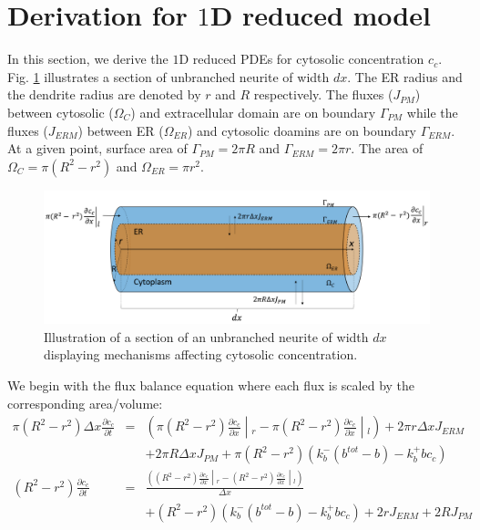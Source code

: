 \documentclass[review,supplement,onefignum,onetabnum]{siamart190516}
\begin{document}
\newpage
\section{Derivation for $1$D reduced model}
In this section, we derive the $1$D reduced PDEs for cytosolic \Ca concentration $c_c$. Fig. \ref{fig:Illustration_Supp} illustrates a section of unbranched neurite of width $dx$. The ER radius and the dendrite radius are denoted by $r$ and $R$ respectively. The fluxes ($J_{PM}$) between cytosolic ($\Omega_{C}$) and extracellular domain are on boundary $\Gamma_{PM}$ while the fluxes ($J_{ERM}$) between ER ($\Omega_{ER}$) and cytosolic doamins are on boundary $\Gamma_{ERM}$. At a given point, surface area of $\Gamma_{PM}=2\pi R$ and $\Gamma_{ERM}=2\pi r$. The area of $\Omega_{C}=\pi(R^2-r^2)$ and $\Omega_{ER}=\pi r^2$.

\begin{figure}[H]\label{fig:Illustration_Supp}
    \centering
    \includegraphics[width=\textwidth]{Figures/Illustration_Supp.png}
    \caption{Illustration of a section of an unbranched neurite of width $dx$ displaying mechanisms affecting cytosolic \Ca concentration.} 
\end{figure}

We begin with the flux balance equation where each flux is scaled by the corresponding area/volume:
\begin{eqnarray*}
    \pi(R^2-r^2)\Delta x \frac{\partial c_c}{\partial t} &=& \left(\pi (R^2-r^2) \frac{\partial c_c}{\partial x} \middle\vert_r - \pi (R^2-r^2) \frac{\partial c_c}{\partial x} \middle\vert_l \right) + 2\pi r\Delta x J_{ERM} \\
    &&  + 2\pi R \Delta x J_{PM} + \pi (R^2-r^2)(k_b^-(b^{tot}-b)-k_b^+bc_c)\\
    (R^2 - r^2) \frac{\partial c_c}{\partial t} &=& \frac{\left( (R^2-r^2) 
 \frac{\partial c_c}{\partial x}\middle\vert_r - (R^2-r^2) 
 \frac{\partial c_c}{\partial x}\middle\vert_l \right)}{\Delta x} \\ 
  && + (R^2-r^2)(k_b^-(b^{tot}-b)-k_b^+bc_c)+ 2rJ_{ERM} + 2RJ_{PM}
\end{eqnarray*}
\end{document}
